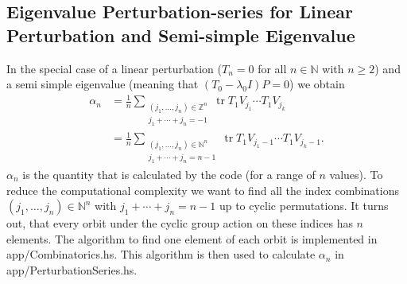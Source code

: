 \documentclass[11pt]{article}
\DeclareMathOperator{\tr}{tr}
\begin{document}
\subsection{Eigenvalue Perturbation-series for Linear Perturbation and Semi-simple Eigenvalue}
In the special case of a linear perturbation ($T_n =0$ for all $n \in \mathbb{N}$ with $n\geq2$)
and a semi simple eigenvalue (meaning that $(T_0- \lambda_0 I) P =0$)
we obtain 
\begin{equation}
    \begin{split}
        \alpha_n &=  \frac{1}{n} \sum_{ \substack{(j_1, \dots, j_n) \in \mathbb{Z}^n \\ j_1 + \cdots + j_n = -1}}
        \tr T_{1} V_{j_1} \cdots T_{1} V_{j_k}\\
        &= \frac{1}{n} \sum_{ \substack{(j_1, \dots, j_n) \in \mathbb{N}^n \\ j_1 + \cdots + j_n = n -1}}
        \tr T_{1} V_{j_1-1} \cdots T_{1} V_{j_k-1}.
    \end{split}
\end{equation}
$\alpha_n$ is the quantity that is calculated by the code (for a range of $n$ values).
To reduce the computational complexity we want to find
all the index combinations $(j_1, \dots, j_n) \in \mathbb{N}^n  $ with $ j_1 + \cdots + j_n = n -1$
up to cyclic permutations. 
It turns out, that every orbit under the cyclic group action on these indices has $n$ elements.
The algorithm to find one element of each orbit is implemented in app/Combinatorics.hs.
This algorithm is then used to calculate $\alpha_n$ in app/PerturbationSeries.hs.
\end{document}

